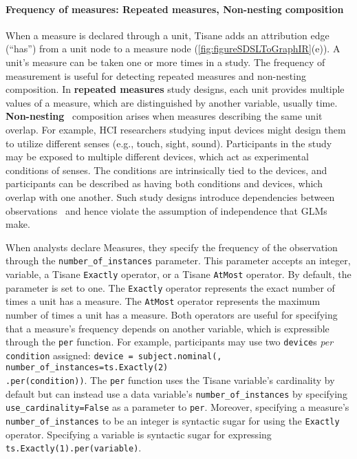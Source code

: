 \paragraph{Frequency of measures: Repeated measures, Non-nesting composition}
\def\numberofinstances{\texttt{number\_of\_instances}\xspace}
When a measure is declared through a unit, Tisane adds an
attribution edge (``has'') from a unit node to a measure node (\autoref{fig:figureSDSLToGraphIR}(e)).
A unit's measure can be taken one or more times in a study. The frequency of
measurement is useful for detecting repeated measures and non-nesting
composition. In \textbf{repeated measures} study designs, each unit provides
multiple values of a measure, which are distinguished by another variable,
usually time. \textbf{Non-nesting}~\cite{gelmanHill2006regression} composition
arises when measures describing the same unit overlap. For example, HCI researchers studying input devices might
design them to utilize different senses (e.g., touch, sight, sound).
Participants in the study may be exposed to multiple different devices, which
act as experimental conditions of senses. The conditions are intrinsically tied to the
devices, and participants can be described as having both conditions and
devices, which overlap with one another. Such study designs
introduce dependencies between observations~\cite{clark1973language} and hence
violate the assumption of independence that GLMs make.

\def\inputdevice{\texttt{device}\xspace} When analysts declare Measures, they
specify the frequency of the observation through the
\texttt{number\_of\_instances} parameter. This parameter accepts an integer,
variable, a Tisane \texttt{Exactly} operator, or a Tisane \texttt{AtMost}
operator. By default, the parameter is set to one. The \texttt{Exactly} operator
represents the exact number of times a unit has a measure. The \texttt{AtMost}
operator represents the maximum number of times a unit has a measure. Both
operators are useful for specifying that a measure's frequency depends on
another variable, which is expressible through the \texttt{per} function. For
example, participants may use two \inputdevice{}s \textit{per}
\texttt{condition} assigned: \texttt{device = subject.nominal(, number\_of\_instances=ts.Exactly(2)\\.per(condition))}. The \texttt{per}
function uses the Tisane variable's cardinality by default but can instead use a
data variable's \numberofinstances by specifying \texttt{use\_cardinality=False}
as a parameter to \texttt{per}. Moreover, specifying a measure's
\texttt{number\_of\_instances} to be an integer is syntactic sugar for using the
\texttt{Exactly} operator. Specifying a variable is syntactic sugar for
expressing \texttt{ts.Exactly(1).per(variable)}.

